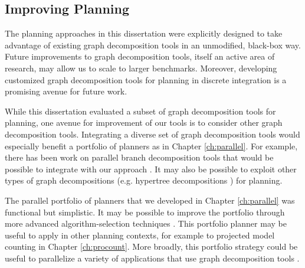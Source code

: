 
\subsection{Improving Planning}
The planning approaches in this dissertation were explicitly designed to take advantage of existing graph decomposition tools in an unmodified, black-box way.
Future improvements to graph decomposition tools, itself an active area of research, may allow us to scale to larger benchmarks.
Moreover, developing customized graph decomposition tools for planning in discrete integration is a promising avenue for future work.

While this dissertation evaluated a subset of graph decomposition tools for planning, one avenue for improvement of our tools is to consider other graph decomposition tools.
Integrating a diverse set of graph decomposition tools would especially benefit a portfolio of planners as in Chapter \ref{ch:parallel}.
For example, there has been work on parallel branch decomposition tools that would be possible to integrate with our approach \cite{hicks2000branch}.
It may also be possible to exploit other types of graph decompositions (e.g. hypertree decompositions \cite{AGG07}) for planning.

The parallel portfolio of planners that we developed in Chapter \ref{ch:parallel} was functional but simplistic.
It may be possible to improve the portfolio through more advanced algorithm-selection techniques \cite{HHLKS09,XHHL12}. 
This portfolio planner may be useful to apply in other planning contexts, for example to projected model counting in Chapter \ref{ch:procount}.
More broadly, this portfolio strategy could be useful to parallelize a variety of applications that use graph decomposition tools \cite{MPPV04,applegate2011traveling,cygan2015parameterized,GLST17}.


